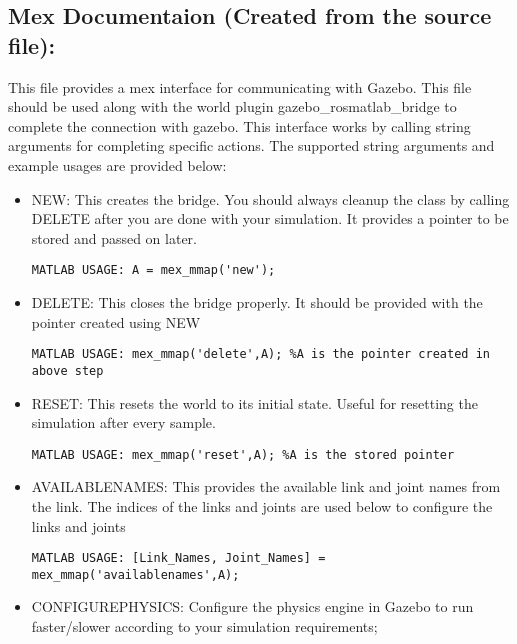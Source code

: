 \documentclass[letterpaper,10pt]{article}
\begin{document}
\subsection{Mex Documentaion (Created from the source
file):}\label{mex-documentaion-created-from-the-source-file}

This file provides a mex interface for communicating with Gazebo. This
file should be used along with the world plugin
gazebo\_rosmatlab\_bridge to complete the connection with gazebo. This
interface works by calling string arguments for completing specific
actions. The supported string arguments and example usages are provided
below: 
\begin{itemize}
\item NEW: This creates the bridge. You should always cleanup the
class by calling DELETE after you are done with your simulation. It
provides a pointer to be stored and passed on later.

\begin{Verbatim}[frame=single]
             MATLAB USAGE: A = mex_mmap('new');
\end{Verbatim}

\item
  DELETE: This closes the bridge properly. It should be provided with
  the pointer created using NEW

\begin{Verbatim}[frame=single]
        MATLAB USAGE: mex_mmap('delete',A); %A is the pointer created in above step
\end{Verbatim}
\item
  RESET: This resets the world to its initial state. Useful for
  resetting the simulation after every sample.

\begin{Verbatim}[frame=single]
        MATLAB USAGE: mex_mmap('reset',A); %A is the stored pointer
\end{Verbatim}
\item
  AVAILABLENAMES: This provides the available link and joint names from
  the link. The indices of the links and joints are used below to
  configure the links and joints

\begin{Verbatim}[frame=single]
        MATLAB USAGE: [Link_Names, Joint_Names] = mex_mmap('availablenames',A);
\end{Verbatim}
\item
  CONFIGUREPHYSICS: Configure the physics engine in Gazebo to run
  faster/slower according to your simulation requirements;


\end{itemize}
\end{document}
